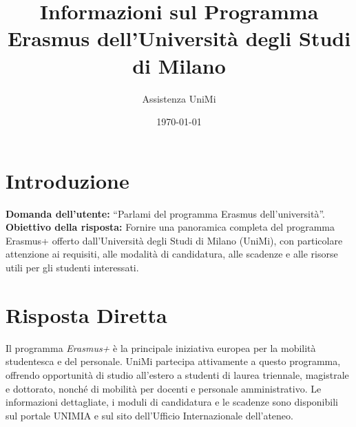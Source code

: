 \documentclass{article}
\title{Informazioni sul Programma Erasmus dell'Università degli Studi di Milano}
\author{Assistenza UniMi}
\date{\today}
\begin{document}
\maketitle

\section{Introduzione}
\textbf{Domanda dell'utente:} ``Parlami del programma Erasmus dell'università''.  
\textbf{Obiettivo della risposta:} Fornire una panoramica completa del programma Erasmus+ offerto dall'Università degli Studi di Milano (UniMi), con particolare attenzione ai requisiti, alle modalità di candidatura, alle scadenze e alle risorse utili per gli studenti interessati.

\section{Risposta Diretta}
Il programma \textit{Erasmus+} è la principale iniziativa europea per la mobilità studentesca e del personale.  
UniMi partecipa attivamente a questo programma, offrendo opportunità di studio all'estero a studenti di laurea triennale, magistrale e dottorato, nonché di mobilità per docenti e personale amministrativo.  
Le informazioni dettagliate, i moduli di candidatura e le scadenze sono disponibili sul portale UNIMIA e sul sito dell'Ufficio Internazionale dell'ateneo.
\end{document}
